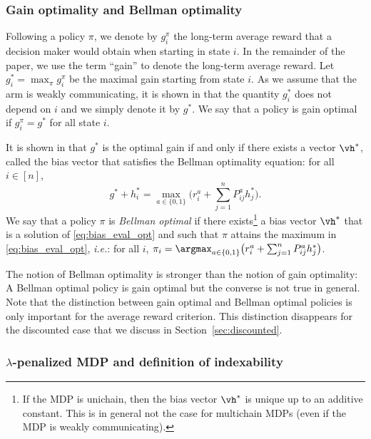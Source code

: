 \subsubsection{Gain optimality and Bellman optimality}
\label{ssec:bellman_optimal}

Following a policy $\pi$, we denote by $g^\pi_i$ the long-term average reward that a decision maker would obtain when starting in state $i$. In the remainder of the paper, we use the term ``gain'' to denote the long-term average reward. Let $g^*_i=\max_\pi g^\pi_i$ be the maximal gain starting from state $i$.  As we assume that the arm is weakly communicating, it is shown in \citep[Chapter 8]{puterman2014markov} that the quantity $g^*_i$ does not depend on $i$ and we simply denote it by $g^*$.  We say that a policy is gain optimal if $g^\pi_i=g^*$ for all state $i$.

It is shown in \citep[Chapter 8]{puterman2014markov} that $g^*$ is the optimal gain if and only if there exists a vector $\vh^*$, called the bias vector that satisfies the Bellman optimality equation:  for all $i\in[n]$,
\begin{equation}
    g^* + h^*_i = \max_{a\in\{0,1\}} \Big( r^{a}_i + \sum_{j=1}^n P^{a}_{ij}h^*_j \Big).  \label{eq:bias_eval_opt}
\end{equation}
We say that a policy  $\pi$ is \emph{Bellman optimal} if there exists\footnote{If the MDP is unichain, then the bias vector $\vh^*$ is unique up to an additive constant.  This is in general not the case for multichain MDPs (even if the MDP is weakly communicating).
} a bias vector $\vh^*$ that is a solution of \eqref{eq:bias_eval_opt} and such that $\pi$ attains the maximum in \eqref{eq:bias_eval_opt}, \emph{i.e.}: for all $i$, ${\pi_i=\argmax_{a\in\{0,1\}} \big(r^{a}_i + \sum_{j=1}^n P^{a}_{ij}h^*_j\big)}$.

The notion of Bellman optimality is stronger than the notion of gain optimality: A Bellman optimal policy is gain optimal but the converse is not true in general. Note that the distinction between gain optimal and Bellman optimal policies is only important for the average reward criterion. This distinction disappears for the discounted case that we discuss in Section~\ref{sec:discounted}.

\subsubsection{\texorpdfstring{$\lambda$-p}{P}enalized MDP and definition of indexability}
\label{sssec:penal_mdp}

